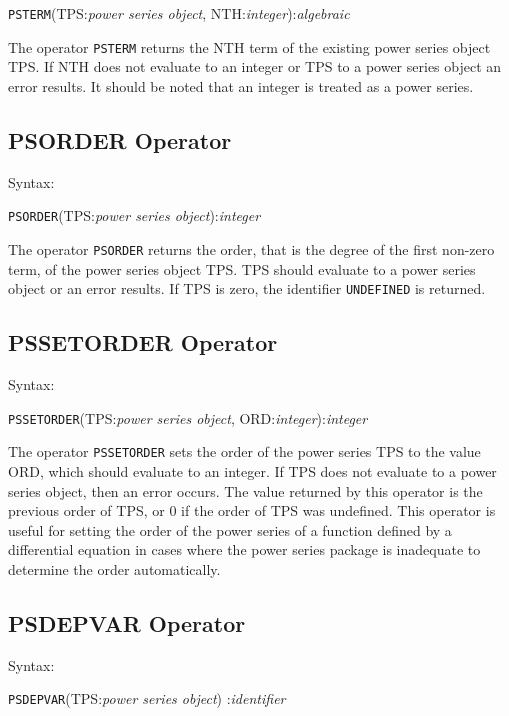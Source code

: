 \hspace*{2em} {\tt PSTERM}(TPS:{\em power series object},
NTH:{\em integer}):{\em algebraic}

The operator {\tt PSTERM} returns the NTH term of the existing
power series object TPS. If NTH does not evaluate to
an integer or TPS to a power series object an error results.  It
should be noted that an integer is treated as a power series.


\subsection{PSORDER Operator}

Syntax:

\hspace*{2em} {\tt PSORDER}(TPS:{\em power series object}):{\em integer}

The operator {\tt PSORDER} returns the order, that is the degree of
the first non-zero term, of the power series object TPS.
TPS should evaluate to a power series object or an error results. If
TPS is zero, the identifier {\tt UNDEFINED} is returned.

\subsection{PSSETORDER Operator}

Syntax:

\hspace*{2em} {\tt PSSETORDER}(TPS:{\em power series object},
ORD:{\em integer}):{\em integer}

The operator {\tt PSSETORDER} sets the order of the power series
TPS to the value ORD, which should evaluate to an integer. If
TPS does not evaluate to a power series object, then an error
occurs. The value returned by this operator is the previous order of
TPS, or 0 if the order of TPS was undefined.  This
operator is useful for setting the order of the power series of a
function defined by a differential equation in cases where the power
series package is inadequate to determine the order automatically.


\subsection{PSDEPVAR Operator}

Syntax:

\hspace*{2em} {\tt PSDEPVAR}(TPS:{\em power series object})
:{\em identifier}

